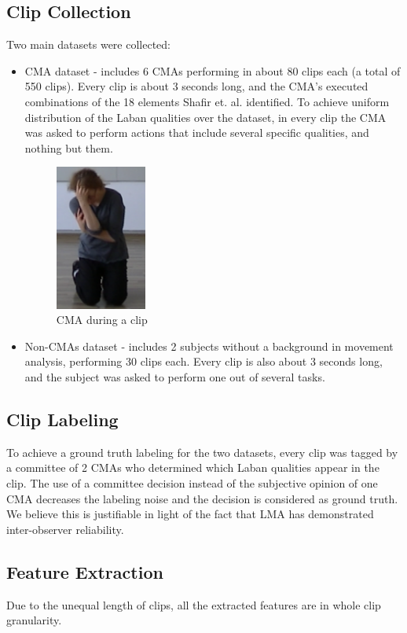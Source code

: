 \documentclass[11pt,twocolumn,varwidth=true,a4paper,fleqn]{article}
\begin{document}
\subsection{Clip Collection}
Two main datasets were collected: 
\begin{itemize}
  	\item 
	 CMA dataset - includes 6 CMAs performing in about
	80 clips each (a total of 550 clips). Every clip is about 3 seconds long, and
	the CMA's executed combinations of the 18 elements Shafir et. al. identified. 
	To achieve uniform distribution of the Laban qualities over the dataset, in every 
	clip the CMA was asked to perform actions that include several specific qualities, 
	and nothing but them.
	
	\begin{figure}[h]
	\centering
	\includegraphics[width=30mm]{Rachelle.png}
	\caption{CMA during a clip}
	\label{Rachelle}
	\end{figure}
	
	\item 
	Non-CMAs dataset - includes 2 subjects without a background in movement
	analysis, performing 30 clips each. Every clip is also about 3 seconds long,
	and the subject was asked to perform one out of several
	tasks.
\end{itemize}
\subsection{Clip Labeling}
To achieve a ground truth labeling for the two datasets, every clip was tagged by
a committee of 2 CMAs who determined which Laban qualities appear in the
clip. The use of a committee decision instead of the subjective opinion of one
CMA decreases the labeling noise and the decision is considered as ground truth.
We believe this is justifiable in light of the fact that LMA has demonstrated 
inter-observer reliability.
\subsection{Feature Extraction}
Due to the unequal length of clips, all the extracted features are in whole clip 
granularity.
\end{document}
